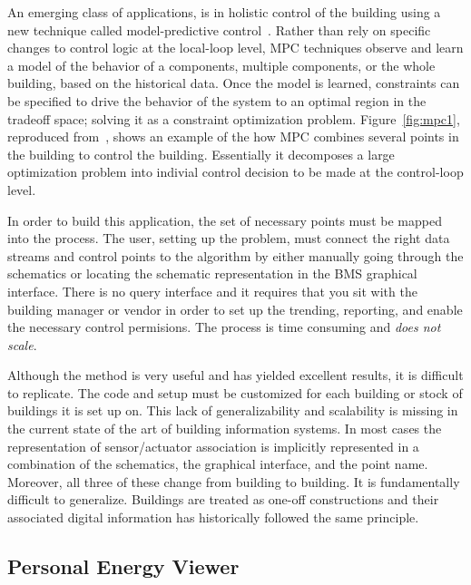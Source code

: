 An emerging class of applications, is in holistic control of the building using a new technique called model-predictive control~\cite{MPC}.
Rather than rely on specific changes to control logic at the local-loop level, MPC techniques observe and learn a model
of the behavior of a components, multiple components, or the whole building, based on the historical data.  Once the model is learned, 
constraints can be specified to drive the behavior of the system to an optimal region in the tradeoff space; solving it as 
a constraint optimization problem.  Figure~\ref{fig:mpc1}, reproduced from~\cite{MPC}, shows an example of the how MPC combines 
several points in the building to control the building.  Essentially it decomposes a large optimization problem into indivial control 
decision to be made at the control-loop level.

In order to build this application, the set of necessary points must be mapped into the process.  The user, setting up the problem,
must connect the right data streams and control points to the algorithm by either manually going through the schematics or
locating the schematic representation in the BMS graphical interface.  There is no query interface and it requires that you sit
with the building manager or vendor in order to set up the trending, reporting, and enable the necessary control permisions.
The process is time consuming and \emph{does not scale}.

Although the method is very useful and has yielded excellent results, it is difficult to replicate.  The code and setup must be 
customized for each building or stock of buildings it is set up on.  This lack of generalizability and scalability is missing
in the current state of the art of building information systems.  In most cases the representation of sensor/actuator association is 
implicitly represented in a combination of the schematics, the graphical interface, and the point name.  Moreover, all
three of these change from building to building.  It is fundamentally difficult to generalize.  Buildings are treated as one-off constructions
and their associated digital information has historically followed the same principle.


\subsection{Personal Energy Viewer}
\label{sec:mobile}

